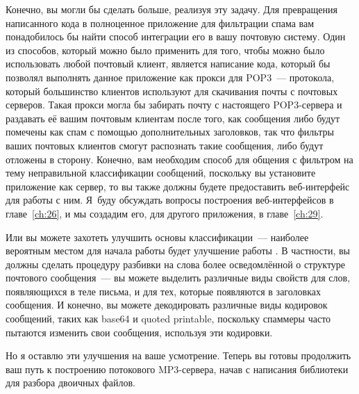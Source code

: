 Конечно, вы могли бы сделать больше, реализуя эту задачу.  Для превращения напи\-сан\-ного кода
в полноценное приложение для фильтрации спама вам понадобилось бы найти способ интеграции
его в вашу почтовую систему.  Один из способов, который можно было применить для того,
чтобы можно было использовать любой почтовый клиент, является написание кода, который бы
позволял выполнять данное приложение как прокси для POP3~--- протокола, который
большинство клиентов используют для скачивания почты с почтовых серверов.  Такая прокси
могла бы забирать почту с настоящего POP3-сервера и раздавать её вашим почтовым клиентам
после того, как сообщения либо будут помечены как спам с помощью дополнительных
заголовков, так что фильтры ваших почтовых клиентов смогут распознать такие сообщения,
либо будут отложены в сторону.  Конечно, вам необходим способ для общения с фильтром на
тему неправильной классификации сообщений, поскольку вы установите приложение как
сервер, то вы также должны будете предоставить веб-интерфейс для работы с ним.  Я~буду
обсуждать вопросы построения веб-интерфейсов в главе~\ref{ch:26}, и мы создадим его, для
другого приложения, в главе~\ref{ch:29}.

Или вы можете захотеть улучшить основы классификации~--- наиболее вероятным местом для
начала работы будет улучшение работы .  В частности, вы должны
сделать процедуру разбивки на слова более осведомлённой о структуре почтового сообщения~---
вы можете выделить различные виды свойств для слов, появляющихся в теле письма, и для тех,
которые появляются в заголовках сообщения.  И конечно, вы можете декодировать различные
виды кодировок сообщений, таких как base64 и quoted printable, поскольку спаммеры часто
пытаются изменить свои сообщения, используя эти кодировки.

Но я оставлю эти улучшения на ваше усмотрение.  Теперь вы готовы продолжить ваш путь к
построению потокового MP3-сервера, начав с написания библиотеки для разбора двоичных
файлов.

